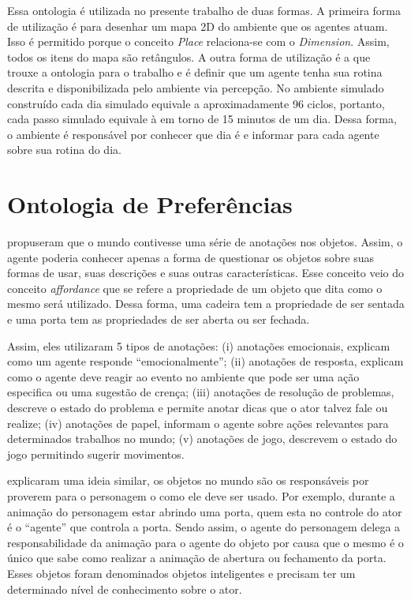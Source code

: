 Essa ontologia é utilizada no presente trabalho de duas formas. A primeira
forma de utilização é para desenhar um mapa 2D do ambiente que os agentes
atuam. Isso é permitido porque o conceito \emph{Place} relaciona-se com o
\emph{Dimension}. Assim, todos os itens do mapa são retângulos. A outra forma
de utilização é a que trouxe a ontologia para o trabalho e é definir que um
agente tenha sua rotina descrita e disponibilizada pelo ambiente via
percepção. No ambiente simulado construído cada dia simulado equivale a
aproximadamente 96 ciclos, portanto, cada passo simulado equivale à em torno
de 15 minutos de um dia. Dessa forma, o ambiente é responsável por conhecer
que dia é e informar para cada agente sobre sua rotina do dia.

\section{Ontologia de Preferências} \label{ch:aec:oda}

\citet{doyle1998annotated} propuseram que o mundo contivesse uma série de
anotações nos objetos. Assim, o agente poderia conhecer apenas a forma de
questionar os objetos sobre suas formas de usar, suas descrições e suas outras
características. Esse conceito veio do conceito \emph{affordance} que se
refere a propriedade de um objeto que dita como o mesmo será utilizado.
Dessa forma, uma cadeira tem a propriedade de ser sentada e uma porta tem as
propriedades de ser aberta ou ser fechada.

Assim, eles utilizaram 5 tipos de anotações: (i) anotações emocionais,
explicam como um agente responde ``emocionalmente''; (ii) anotações de
resposta, explicam como o agente deve reagir ao evento no ambiente que pode ser
uma ação especifica ou uma sugestão de crença; (iii) anotações de resolução de
problemas, descreve o estado do problema e permite anotar dicas que o ator
talvez fale ou realize; (iv) anotações de papel, informam o agente sobre ações
relevantes para determinados trabalhos no mundo; (v) anotações de jogo,
descrevem o estado do jogo permitindo sugerir movimentos.

\citet{kallmann1999modeling} explicaram uma ideia similar, os objetos no mundo
são os responsáveis por proverem para o personagem o como ele deve ser usado.
Por exemplo, durante a animação do personagem estar abrindo uma porta, quem esta
no controle do ator é o ``agente'' que controla a porta. Sendo assim, o agente do
personagem delega a responsabilidade da animação para o agente do objeto por
causa que o mesmo é o único que sabe como realizar a animação de abertura ou
fechamento da porta. Esses objetos foram denominados objetos inteligentes e precisam
ter um determinado nível de conhecimento sobre o ator.


